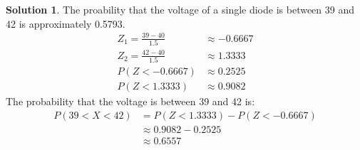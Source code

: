 \documentclass[11pt]{article}
\theoremstyle{definition}
\newtheorem*{solution}{Solution}
\begin{document}
\begin{solution}
    The proability that the voltage of a single diode is between 39 and 42 is approximately 0.5793.
    \begin{align}
        Z_1 = \frac{39 - 40}{1.5} &\approx -0.6667 \\
        Z_2 = \frac{42 - 40}{1.5} &\approx 1.3333 \\
        P(Z < -0.6667) &\approx 0.2525 \\
        P(Z < 1.3333) &\approx 0.9082
    \end{align}
    The probability that the voltage is between 39 and 42 is:
    \begin{align}
        P(39 < X < 42) &= P(Z < 1.3333) - P(Z < -0.6667) \\
        &\approx 0.9082 - 0.2525 \\
        &\approx 0.6557
    \end{align}
\end{solution}
\end{document}
